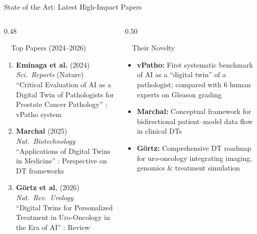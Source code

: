 \documentclass[aspectratio=169, 10pt]{beamer}
\begin{document}
\begin{frame}{State of the Art: Latest High-Impact Papers}

\begin{columns}[T]
\begin{column}{0.48\textwidth}

\begin{block}{\faFile\ \ Top Papers (2024--2026)}
\footnotesize
\begin{enumerate}\setlength{\itemsep}{3pt}
    \item \textbf{Eminaga et al.} (2024) \textit{Sci.\ Reports} (Nature)\\
    \textcolor{dtblue}{``Critical Evaluation of AI as a Digital Twin of Pathologists for Prostate Cancer Pathology''} : vPatho system
    \item \textbf{Marchal} (2025) \textit{Nat.\ Biotechnology}\\
    \textcolor{dtblue}{``Applications of Digital Twins in Medicine''} : Perspective on DT frameworks
    \item \textbf{G\"ortz et al.} (2026) \textit{Nat.\ Rev.\ Urology}\\
    \textcolor{dtblue}{``Digital Twins for Personalized Treatment in Uro-Oncology in the Era of AI''} : Review
\end{enumerate}
\end{block}

\end{column}

\begin{column}{0.50\textwidth}

\begin{alertblock}{\faLightbulb\ \ Their Novelty}
\footnotesize
\begin{itemize}\setlength{\itemsep}{2pt}
    \item[\faCheckCircle] \textbf{vPatho:} First systematic benchmark of AI as a ``digital twin'' of a pathologist; compared with 6 human experts on Gleason grading
    \item[\faCheckCircle] \textbf{Marchal:} Conceptual framework for bidirectional patient--model data flow in clinical DTs
    \item[\faCheckCircle] \textbf{G\"ortz:} Comprehensive DT roadmap for uro-oncology integrating imaging, genomics \& treatment simulation
\end{itemize}
\end{alertblock}


\end{column}
\end{columns}
\end{frame}
\end{document}
